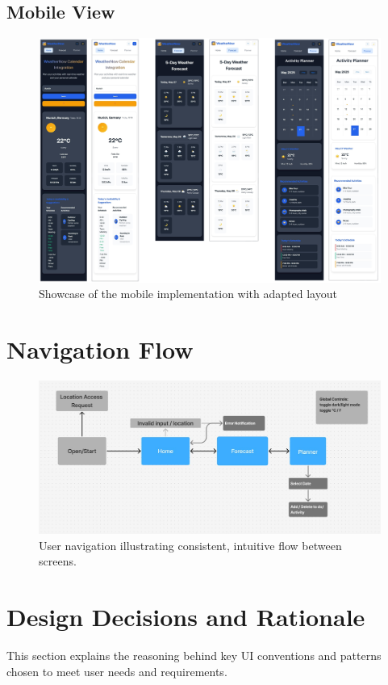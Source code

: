 \documentclass[11pt,a4paper]{article}
\begin{document}
\subsection{Mobile View}
\FloatBarrier
\begin{figure}[H]
  \centering
  \includegraphics[width=\linewidth]{mobile_all.jpg}
  \caption{Showcase of the mobile implementation with adapted layout}
  \label{fig:calendar_desktop}
\end{figure}
\FloatBarrier

\section{Navigation Flow}
\FloatBarrier
\begin{figure}[H]
  \centering
  \includegraphics[width=\linewidth]{navigation_flow.jpg}
  \caption{User navigation illustrating consistent, intuitive flow between screens.}
  \label{fig:flow}
\end{figure}
\FloatBarrier

\section{Design Decisions and Rationale}
This section explains the reasoning behind key UI conventions and patterns chosen to meet user needs and requirements.
\end{document}
